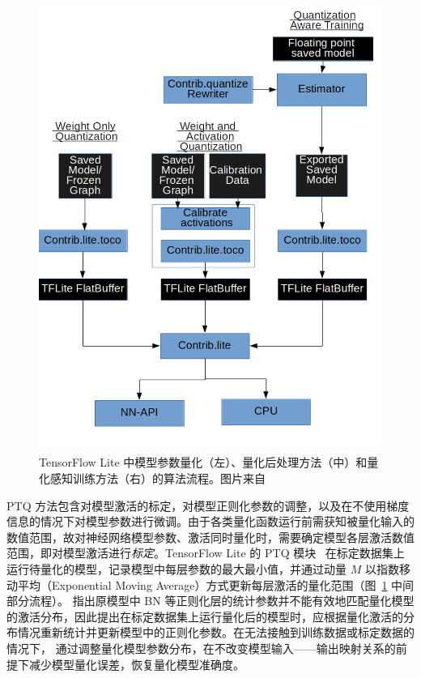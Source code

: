 \documentclass[
  fontset = mac,
]{shtthesis}
\begin{document}
\begin{figure}[htb]
  \centering
  \includegraphics[width=0.75\columnwidth]{img/Background/qat_ptq.png}
  \caption{TensorFlow Lite 中模型参数量化（左）、量化后处理方法（中）和量化感知训练方法（右）的算法流程。图片来自~\citet{krishnamoorthi2018quantizing}}
  \label{img::background::qat_ptq}
\end{figure}

PTQ 方法包含对模型激活的标定，对模型正则化参数的调整，以及在不使用梯度信息的情况下对模型参数进行微调。由于各类量化函数运行前需获知被量化输入的数值范围，故对神经网络模型参数、激活同时量化时，需要确定模型各层激活数值范围，即对模型激活进行\emph{标定}。TensorFlow Lite 的 PTQ 模块~\citep{abadi2016tensorflow, krishnamoorthi2018quantizing} 在标定数据集上运行待量化的模型，记录模型中每层参数的最大最小值，并通过动量 $M$ 以指数移动平均（Exponential Moving Average）方式更新每层激活的量化范围（图~\ref{img::background::qat_ptq} 中间部分流程）。\citet{he2018learning, peters2018probabilistic} 指出原模型中 BN 等正则化层的统计参数并不能有效地匹配量化模型的激活分布，因此提出在标定数据集上运行量化后的模型时，应根据量化激活的分布情况重新统计并更新模型中的正则化参数。在无法接触到训练数据或标定数据的情况下，\citet{nagel2019data, meller2019same} 通过调整量化模型参数分布，在不改变模型输入——输出映射关系的前提下减少模型量化误差，恢复量化模型准确度。
\end{document}
